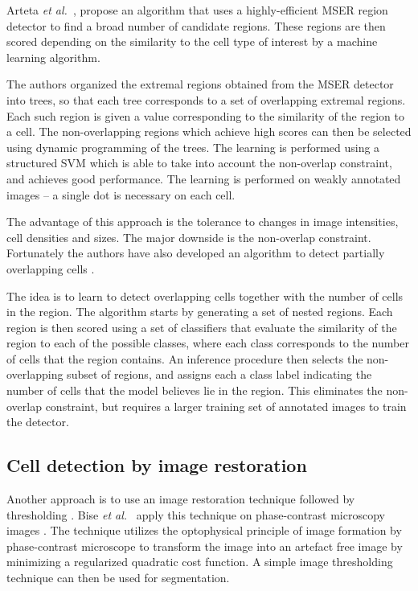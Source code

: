 Arteta \emph{et al.}~\cite{arteta12, arteta13}, propose an algorithm that uses a highly-efficient MSER region detector \cite{matas02} to find a broad number of candidate regions. These regions are then scored depending on the similarity to the cell type of interest by a machine learning algorithm. 

The authors organized the extremal regions obtained from the MSER detector into trees, so that each tree corresponds to a set of overlapping extremal regions. Each such region is given a value corresponding to the similarity of the region to a cell. The non-overlapping regions which achieve high scores can then be selected using dynamic programming of the trees. The learning is performed using a structured SVM \cite{joachims09} which is able to take into account the non-overlap constraint, and achieves good performance. The learning is performed on weakly annotated images -- a single dot is necessary on each cell.

The advantage of this approach is the tolerance to changes in image intensities, cell densities and sizes. The major downside is the non-overlap constraint. Fortunately the authors have also developed an algorithm to detect partially overlapping cells \cite{arteta13}. 

The idea is to learn to detect overlapping cells together with the number of cells in the region. The algorithm starts by generating a set of nested regions. Each region is then scored using a set of classifiers that evaluate the similarity of the region to each of the possible classes, where each class corresponds to the number of cells that the region contains. An inference procedure then selects the non-overlapping subset of regions, and assigns each a class label indicating the number of cells that the model believes lie in the region. This eliminates the non-overlap constraint, but requires a larger training set of annotated images to train the detector.

\subsection{Cell detection by image restoration \statusfirstdraft}

Another approach is to use an image restoration technique followed by thresholding \cite{bise11,huh13}. Bise \emph{et al.}~\cite{bise11} apply this technique on phase-contrast microscopy images . The technique utilizes the optophysical principle of image formation by phase-contrast microscope to transform the image into an artefact free image by minimizing a regularized quadratic cost function. A simple image thresholding technique can then be used for segmentation.

